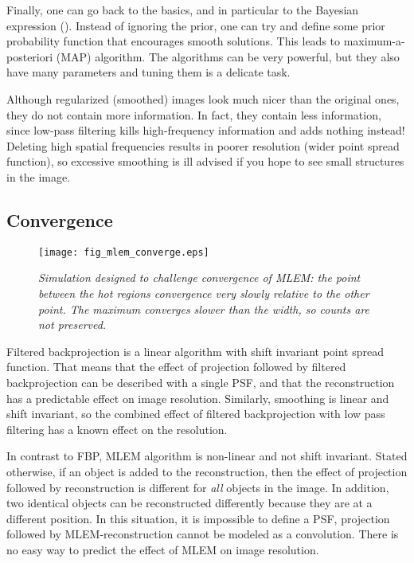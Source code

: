 Finally, one can go back to the basics, and in particular to the
Bayesian expression (). Instead of ignoring the prior,
one can try and define some prior probability function that encourages
smooth solutions. This leads to maximum-a-posteriori (MAP)
algorithm. The algorithms can be very powerful, but they also have
many parameters and tuning them is a delicate task.

Although regularized (smoothed) images look much nicer than the original ones,
they do not contain more information. In fact, they contain less information,
since low-pass filtering kills high-frequency information and adds nothing
instead! Deleting high spatial frequencies results in poorer resolution (wider
point spread function), so excessive smoothing is ill advised if you hope to
see small structures in the image.

\subsection{Convergence \label{sec:mlemconverge}}
\begin{figure}[tb]
\centering
\texttt{[image: fig\_mlem\_converge.eps]}
\caption{\label{fig:mlem_converge} \emph{Simulation designed to challenge
convergence of MLEM: the point between the hot regions convergence very slowly
relative to the other point. The maximum converges slower than the width, so
counts are not preserved.}}
\end{figure}
%
Filtered backprojection is a linear algorithm with shift invariant point
spread function. That means that the effect of projection followed by filtered
backprojection can be described with a single PSF, and that the reconstruction
has a predictable effect on image resolution. Similarly, smoothing is linear
and shift invariant, so the combined effect of filtered backprojection with
low pass filtering has a known effect on the resolution.

In contrast to FBP, MLEM algorithm is non-linear and not shift invariant.
Stated otherwise, if an object is added to the reconstruction, then the effect
of projection followed by reconstruction is different for {\em all} objects in
the image. In addition, two identical objects can be reconstructed differently
because they are at a different position. In this situation, it is impossible
to define a PSF, projection followed by MLEM-reconstruction cannot be modeled
as a convolution. There is no easy way to predict the effect of MLEM on image
resolution. 

